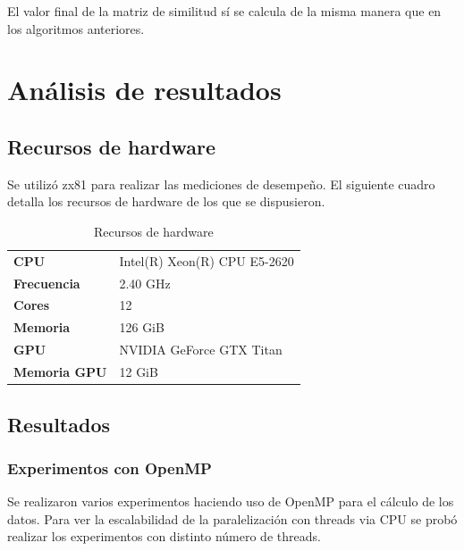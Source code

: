 \documentclass[11pt, a4paper]{article}
\begin{document}
  El valor final de la matriz de similitud sí se calcula de la misma manera que
  en los algoritmos anteriores.

  \section{Análisis de resultados}\label{sec:resultados}

  \subsection{Recursos de hardware}

  Se utilizó zx81 para realizar las mediciones de desempeño. El siguiente
  cuadro detalla los recursos de hardware de los que se dispusieron.

  \begin{table}[h]
      \centering
      \begin{tabular}{ll}
          \hline
          \textbf{CPU} & Intel(R) Xeon(R) CPU E5-2620 \\
          \textbf{Frecuencia} & 2.40 GHz \\
          \textbf{Cores} & 12 \\
          \textbf{Memoria} & 126 GiB \\
          \textbf{GPU} & NVIDIA GeForce GTX Titan \\
          \textbf{Memoria GPU} & 12 GiB \\
          \hline
      \end{tabular}
      \caption*{Recursos de hardware}
  \end{table}
 
  \subsection{Resultados}

  \subsubsection{Experimentos con OpenMP}

  Se realizaron varios experimentos haciendo uso de OpenMP para el cálculo de
  los datos. Para ver la escalabilidad de la paralelización con threads via
  CPU se probó realizar los experimentos con distinto número de threads.
\end{document}
